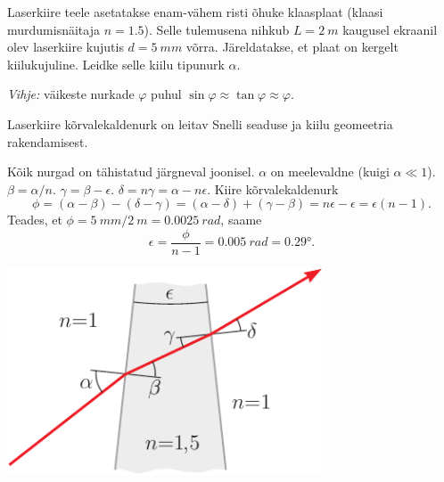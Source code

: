 
Laserkiire teele asetatakse enam-vähem risti õhuke klaasplaat (klaasi murdumisnäitaja $n = \num{1,5}$). Selle tulemusena nihkub $L = \SI{2}{m}$ kaugusel ekraanil olev laserkiire kujutis $d = \SI{5}{mm}$ võrra. Järeldatakse, et plaat on kergelt kiilukujuline. Leidke selle kiilu tipunurk $\alpha$. 

\emph{Vihje:} väikeste nurkade $\varphi$ puhul $\sin \varphi \approx \tan \varphi \approx \varphi$.

\hint
Laserkiire kõrvalekaldenurk on leitav Snelli seaduse ja kiilu geomeetria rakendamisest.

\solu
Kõik nurgad on tähistatud järgneval joonisel. $\alpha$ on meelevaldne (kuigi $\alpha \ll 1$). $\beta = \alpha /n$. $\gamma = \beta - \epsilon$. $\delta = n\gamma = \alpha - n\epsilon$. Kiire kõrvalekaldenurk
\[
\phi=(\alpha-\beta)-(\delta-\gamma)=(\alpha-\delta)+(\gamma-\beta)=n \epsilon-\epsilon=\epsilon(n-1).
\]
Teades, et $\phi = \SI{5}{mm}/\SI{2}{m} = \SI{0.0025}{rad}$, saame
\[
\epsilon=\frac{\phi}{n-1}=\SI{0,005}{rad}=\ang{0,29}.
\]

\begin{center}
	\includegraphics[width=0.7\textwidth]{2007-v3g-03-yl}
\end{center}
\probend